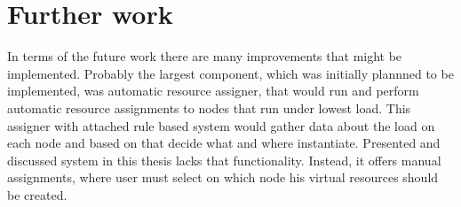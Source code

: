 \documentclass[11pt]{book}
\begin{document}
		

    \section{Further work}

	
	In terms of the future work there are many improvements that might be implemented. Probably the largest component, which was initially plannned to be implemented, was automatic resource assigner, that would run
        and perform automatic resource assignments to nodes that run under lowest load. This assigner with attached rule based system would gather data about the load on each node and based on that 
	decide what and where instantiate. Presented and discussed system in this thesis lacks that functionality. Instead, it offers manual assignments, where user must select on which node his virtual resources should be created. 


  
  
\end{document}
